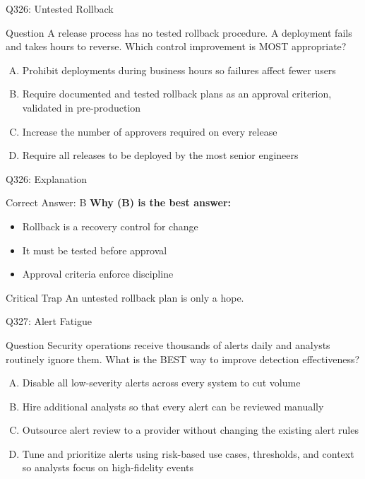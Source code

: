 \documentclass{beamer}
\begin{document}
	\begin{frame}{Q326: Untested Rollback}
		\begin{block}{Question}
			\small A release process has no tested rollback procedure. A deployment fails and takes hours to reverse. Which control improvement is MOST appropriate?
		\end{block}
		\begin{enumerate}[(A)]
			\footnotesize
			\item Prohibit deployments during business hours so failures affect fewer users
			\item Require documented and tested rollback plans as an approval criterion, validated in pre-production
			\item Increase the number of approvers required on every release
			\item Require all releases to be deployed by the most senior engineers
		\end{enumerate}
	\end{frame}
	
	\begin{frame}{Q326: Explanation}
		\begin{block}{Correct Answer: B}
			\textbf{Why (B) is the best answer:}
			\begin{itemize}
				\item Rollback is a recovery control for change
				\item It must be tested before approval
				\item Approval criteria enforce discipline
			\end{itemize}
		\end{block}
		\begin{alertblock}{Critical Trap}
			An untested rollback plan is only a hope.
		\end{alertblock}
	\end{frame}
	
	\begin{frame}{Q327: Alert Fatigue}
		\begin{block}{Question}
			\small Security operations receive thousands of alerts daily and analysts routinely ignore them. What is the BEST way to improve detection effectiveness?
		\end{block}
		\begin{enumerate}[(A)]
			\footnotesize
			\item Disable all low-severity alerts across every system to cut volume
			\item Hire additional analysts so that every alert can be reviewed manually
			\item Outsource alert review to a provider without changing the existing alert rules
			\item Tune and prioritize alerts using risk-based use cases, thresholds, and context so analysts focus on high-fidelity events
		\end{enumerate}
	\end{frame}
	
\end{document}
